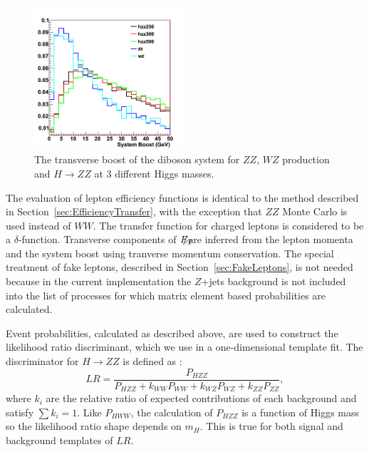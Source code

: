 \documentclass{cmspaper}
\newcommand{\met}{\mbox{$E_T\hspace{-1.1em}/$\hspace{0.7em}}}
\begin{document}
\begin{figure}[!htbp]                                                                                         
\begin{center}                                                                                                
\includegraphics[width=0.5\textwidth]{figures/hzz_boost_allj.png}                                                      
\caption{The transverse boost of the diboson system for $ZZ$, $WZ$ production and $H \rightarrow ZZ$ at 3 different Higgs masses.} 
\label{fig:zzboost}                                                                                           
\end{center}                                                                                                  
\end{figure}  
 
The evaluation of lepton efficiency functions is identical to the method described in Section~\ref{sec:EfficiencyTransfer}, with the 
exception that $ZZ$ Monte Carlo is used instead of $WW$. The transfer function for charged leptons is considered to be a $\delta$-function.
Transverse components of \met are inferred from the lepton momenta and the system boost using tranverse momentum conservation.
The special treatment of fake leptons, described in Section~\ref{sec:FakeLeptons}, is not needed because in the current implementation
the $Z$+jets background is not included into the list of processes for which matrix element based probabilities are calculated. 

Event probabilities, calculated as described above, are used to construct the likelihood ratio discriminant, 
which we use in a one-dimensional template fit.  The discriminator for $H\rightarrow ZZ$ is defined as :
\begin{equation}
\label{eqn:LRHZZ}
LR = \frac { P_{HZZ}} { P_{HZZ} + k_{WW} P_{WW}+ k_{WZ} P_{WZ} + k_{ZZ} P_{ZZ}},
\end{equation}
where $k_{i}$ are the relative ratio of expected contributions of each background and satisfy $\sum k_{i} =1$.
Like $P_{HWW}$, the calculation of $P_{HZZ}$ is a function of Higgs mass so the likelihood ratio shape depends on $m_H$. 
This is true for both signal and background templates of $LR$.
\end{document}
